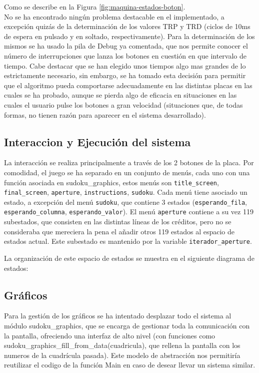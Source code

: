 \documentclass[12pt,letterpaper]{article}
\begin{document}
Como se describe en la Figura \ref{fig:maquina-estados-boton}.\\
No se ha encontrado ningún problema destacable en el implementado, a
excepción quizás de la determinación de los valores TRP y TRD (ciclos
de 10ms de espera en pulsado y en soltado, respectivamente). Para la
determinación de los mismos se ha usado la pila de Debug ya comentada,
que nos permite conocer el número de interrupciones que lanza los
botones en cuestión en que intervalo de tiempo. Cabe destacar que se
han elegido unos tiempos algo mas grandes de lo estrictamente
necesario, sin embargo, se ha tomado esta decisión para permitir que
el algoritmo pueda comportarse adecuadamente en las distintas placas
en las cuales se ha probado, aunque se pierda algo de eficacia en
situaciones en las cuales el usuario pulse los botones a gran
velocidad (situaciones que, de todas formas, no tienen razón para
aparecer en el sistema desarrollado).

\subsection{Interaccion y Ejecución del sistema}
\label{subsec:interaction-ejecucion}
La interacción se realiza principalmente a través de los 2 botones de
la placa. 
Por comodidad, el juego se ha separado en un conjunto de menús, cada
uno con una función asociada en sudoku\_graphics, estos menús son
\texttt{title\_screen}, \texttt{final\_screen}, \texttt{aperture},
\texttt{instructions}, \texttt{sudoku}. Cada menú tiene asociado un
estado, a excepción del menú \texttt{sudoku}, que contiene 3 estados
(\texttt{esperando\_fila}, \texttt{esperando\_columna},
\texttt{esperando\_valor}). El menú \texttt{aperture} contiene a su
vez 119 subestados, que consisten en las distintas líneas de los
créditos, pero no se consideraba que mereciera la pena el añadir otros
119 estados al espacio de estados actual. Este subestado es mantenido
por la variable \texttt{iterador\_aperture}. 

La organización de este espacio de estados se muestra en el siguiente
diagrama de estados:


\subsection{Gráficos}
\label{subsec:graficos}
Para la gestión de los gráficos se ha intentado desplazar todo el
sistema al módulo sudoku\_graphics, que se encarga de gestionar toda
la comunicación con la pantalla, ofreciendo una interfaz de alto nivel
(con funciones como sudoku\_graphics\_fill\_from\_data(cuadricula),
que rellena la pantalla con los numeros de la cuadrícula pasada). Este
modelo de abstracción nos permitiría reutilizar el codigo de la
función Main en caso de desear llevar un sistema similar.
\end{document}
